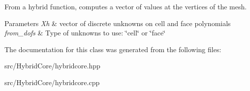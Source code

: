 From a hybrid function, computes a vector of values at the vertices of the mesh. 


\begin{DoxyParams}{Parameters}
{\em Xh} & vector of discrete unknowns on cell and face polynomials \\
\hline
{\em from\+\_\+dofs} & Type of unknowns to use\+: \char`\"{}cell\char`\"{} or \char`\"{}face\char`\"{} \\
\hline
\end{DoxyParams}


The documentation for this class was generated from the following files\+:\begin{DoxyCompactItemize}
\item 
src/\+Hybrid\+Core/hybridcore.\+hpp\item 
src/\+Hybrid\+Core/hybridcore.\+cpp\end{DoxyCompactItemize}
